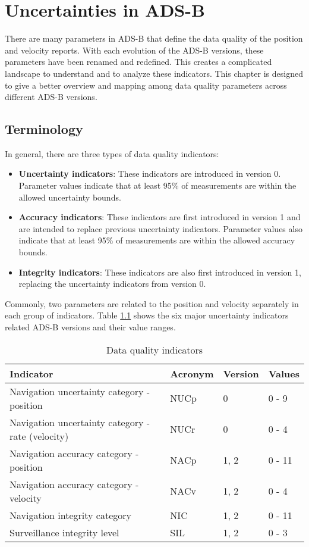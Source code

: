 \chapter{Uncertainties in ADS-B} \label{chap:uncertainty}

There are many parameters in ADS-B that define the data quality of the position and velocity reports. With each evolution of the ADS-B versions, these parameters have been renamed and redefined. This creates a complicated landscape to understand and to analyze these indicators. This chapter is designed to give a better overview and mapping among data quality parameters across different ADS-B versions.

\section{Terminology}
In general, there are three types of data quality indicators:

\begin{itemize}
  \item \textbf{Uncertainty indicators}: These indicators are introduced in version 0. Parameter values indicate that at least 95\% of measurements are within the allowed uncertainty bounds.
  \item \textbf{Accuracy indicators}: These indicators are first introduced in version 1 and are intended to replace previous uncertainty indicators. Parameter values also indicate that at least 95\% of measurements are within the allowed accuracy bounds.
  \item \textbf{Integrity indicators}: These indicators are also first introduced in version 1, replacing the uncertainty indicators from version 0.
\end{itemize}

Commonly, two parameters are related to the position and velocity separately in each group of indicators. Table \ref{tb:measurement-quality-indicators} shows the six major uncertainty indicators related ADS-B versions and their value ranges.

\begin{table}[ht]
\caption{Data quality indicators}
\label{tb:measurement-quality-indicators}
\begin{tabular}{|l|l|l|l|}
\hline
\textbf{Indicator} & \textbf{Acronym} & \textbf{Version} & \textbf{Values} \\ \hline
Navigation uncertainty category - position & NUCp & 0 & 0 - 9 \\ \hline
Navigation uncertainty category - rate (velocity) & NUCr & 0 & 0 - 4 \\ \hline
Navigation accuracy category - position & NACp & 1, 2 & 0 - 11 \\ \hline
Navigation accuracy category - velocity & NACv & 1, 2 & 0 - 4 \\ \hline
Navigation integrity category & NIC & 1, 2 & 0 - 11 \\ \hline
Surveillance integrity level & SIL & 1, 2 & 0 - 3 \\ \hline
\end{tabular}
\end{table}

